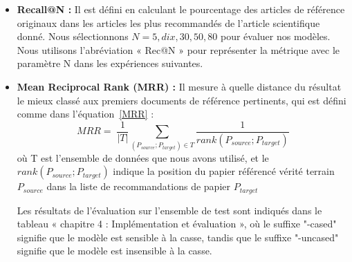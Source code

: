     \begin{itemize}[label=•] %
    \setlength{\itemsep}{5pt}
        
        \item \textbf{Recall@N :} Il est défini en calculant le pourcentage des articles de référence originaux dans les articles les plus recommandés de l'article scientifique donné. Nous sélectionnons $N = {5, dix, 30, 50, 80} $ pour évaluer nos modèles. Nous utilisons l'abréviation « Rec@N » pour représenter la métrique avec le paramètre N dans les expériences suivantes.
        
        \item \textbf{Mean Reciprocal Rank (MRR) :} Il mesure à quelle distance du résultat le mieux classé aux premiers documents de référence pertinents, qui est défini comme dans l'équation~\ref{MRR} :
        \begin{equation}\label{MRR}
            MRR = \;  { \frac{ 1 }{ \lvert T \rvert } }{\sum_{ (P_{source};P_{target} ) \in T } \frac{ 1 }{ rank( P_{source};P_{target} ) } }
        \end{equation}
        où T est l'ensemble de données que nous avons utilisé, et le $rank( P_{source};P_{target} )$ indique la position du papier référencé vérité terrain $P_{source}$ dans la liste de recommandations de papier $P_{target}$
        
        \par Les résultats de l'évaluation sur l'ensemble de test sont indiqués dans le tableau « chapitre 4 : Implémentation et évaluation », où le suffixe "-cased" signifie que le modèle est sensible à la casse, tandis que le suffixe "-uncased" signifie que le modèle est insensible à la casse.
    
    \end{itemize}

        
